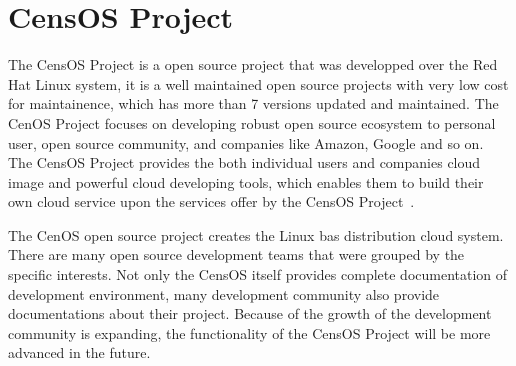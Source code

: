 \section{CensOS Project}

The CensOS Project is a open source project that was developped over the Red Hat Linux system, it is a well maintained open source projects with very low cost for maintainence, which has more than 7 versions updated and maintained. The CenOS Project focuses on developing robust open source ecosystem to personal user, open source community, and companies like Amazon, Google and so on. The CensOS Project provides the both individual users and companies cloud image and powerful cloud developing tools, which enables them to build their own cloud service upon the services offer by the CensOS Project~\cite{centOS}.

The CenOS open source project creates the Linux bas distribution cloud system. There are many open source development teams that were grouped by the specific interests. Not only the CensOS itself provides complete documentation of development environment, many development community also provide documentations about their project. Because of the growth of the development community is expanding, the functionality of the CensOS Project will be more advanced in the future.
